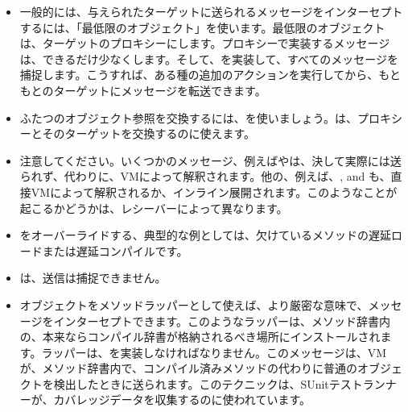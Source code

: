 \documentclass[a4paper,10pt,twoside]{book}
\begin{document}
\begin{itemize}
\item 一般的には、与えられたターゲットに送られるメッセージをインターセプトするには、「最低限のオブジェクト」を使います。最低限のオブジェクトは、ターゲットのプロキシーにします。プロキシーで実装するメッセージは、できるだけ少なくします。そして、を実装して、すべてのメッセージを捕捉します。こうすれば、ある種の追加のアクションを実行してから、もともとのターゲットにメッセージを転送できます。
\item ふたつのオブジェクト参照を交換するには、を使いましょう。は、プロキシーとそのターゲットを交換するのに使えます。
\item 注意してください。いくつかのメッセージ、例えばやは、決して実際には送られず、代わりに、VMによって解釈されます。他の、例えば、\ct{+}, \ct{-} and  も、直接VMによって解釈されるか、インライン展開されます。このようなことが起こるかどうかは、レシーバーによって異なります。%
\item {}をオーバーライドする、典型的な例としては、欠けているメソッドの遅延ロードまたは遅延コンパイルです。
\item {}は、\self{}送信は捕捉できません。
\item オブジェクトをメソッドラッパーとして使えば、より厳密な意味で、メッセージをインターセプトできます。このようなラッパーは、メソッド辞書内の、本来ならコンパイル辞書が格納されるべき場所にインストールされます。ラッパーは、を実装しなければなりません。このメッセージは、VMが、メソッド辞書内で、コンパイル済みメソッドの代わりに普通のオブジェクトを検出したときに送られます。このテクニックは、SUnitテストランナーが、カバレッジデータを収集するのに使われています。%
\end{itemize}

\ifx\wholebook\relax\else
   
   
\end{document}
